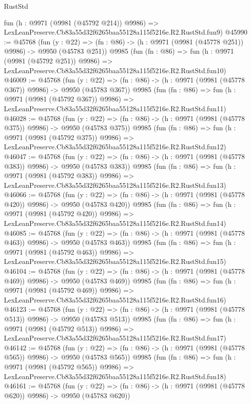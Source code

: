 \begin{lexlean}{RustStd}
\begin{coremodule}
    fun (h : @9971 (@9981 (@45792 @214)) @9986) =>
    LexLeanPreserve.Cb83a55d32f6265baa55128a115f5216e.R2.RustStd.fun9)
@45990 := @45768
    (fun (y : @22) => (fn : @86) -> (h : @9971 (@9981 (@45778 @251)) @9986) -> @9950 (@45783 @251))
    @9985
    (fun (fn : @86) =>
    fun (h : @9971 (@9981 (@45792 @251)) @9986) =>
    LexLeanPreserve.Cb83a55d32f6265baa55128a115f5216e.R2.RustStd.fun10)
@46009 := @45768
    (fun (y : @22) => (fn : @86) -> (h : @9971 (@9981 (@45778 @367)) @9986) -> @9950 (@45783 @367))
    @9985
    (fun (fn : @86) =>
    fun (h : @9971 (@9981 (@45792 @367)) @9986) =>
    LexLeanPreserve.Cb83a55d32f6265baa55128a115f5216e.R2.RustStd.fun11)
@46028 := @45768
    (fun (y : @22) => (fn : @86) -> (h : @9971 (@9981 (@45778 @375)) @9986) -> @9950 (@45783 @375))
    @9985
    (fun (fn : @86) =>
    fun (h : @9971 (@9981 (@45792 @375)) @9986) =>
    LexLeanPreserve.Cb83a55d32f6265baa55128a115f5216e.R2.RustStd.fun12)
@46047 := @45768
    (fun (y : @22) => (fn : @86) -> (h : @9971 (@9981 (@45778 @383)) @9986) -> @9950 (@45783 @383))
    @9985
    (fun (fn : @86) =>
    fun (h : @9971 (@9981 (@45792 @383)) @9986) =>
    LexLeanPreserve.Cb83a55d32f6265baa55128a115f5216e.R2.RustStd.fun13)
@46066 := @45768
    (fun (y : @22) => (fn : @86) -> (h : @9971 (@9981 (@45778 @420)) @9986) -> @9950 (@45783 @420))
    @9985
    (fun (fn : @86) =>
    fun (h : @9971 (@9981 (@45792 @420)) @9986) =>
    LexLeanPreserve.Cb83a55d32f6265baa55128a115f5216e.R2.RustStd.fun14)
@46085 := @45768
    (fun (y : @22) => (fn : @86) -> (h : @9971 (@9981 (@45778 @463)) @9986) -> @9950 (@45783 @463))
    @9985
    (fun (fn : @86) =>
    fun (h : @9971 (@9981 (@45792 @463)) @9986) =>
    LexLeanPreserve.Cb83a55d32f6265baa55128a115f5216e.R2.RustStd.fun15)
@46104 := @45768
    (fun (y : @22) => (fn : @86) -> (h : @9971 (@9981 (@45778 @469)) @9986) -> @9950 (@45783 @469))
    @9985
    (fun (fn : @86) =>
    fun (h : @9971 (@9981 (@45792 @469)) @9986) =>
    LexLeanPreserve.Cb83a55d32f6265baa55128a115f5216e.R2.RustStd.fun16)
@46123 := @45768
    (fun (y : @22) => (fn : @86) -> (h : @9971 (@9981 (@45778 @513)) @9986) -> @9950 (@45783 @513))
    @9985
    (fun (fn : @86) =>
    fun (h : @9971 (@9981 (@45792 @513)) @9986) =>
    LexLeanPreserve.Cb83a55d32f6265baa55128a115f5216e.R2.RustStd.fun17)
@46142 := @45768
    (fun (y : @22) => (fn : @86) -> (h : @9971 (@9981 (@45778 @565)) @9986) -> @9950 (@45783 @565))
    @9985
    (fun (fn : @86) =>
    fun (h : @9971 (@9981 (@45792 @565)) @9986) =>
    LexLeanPreserve.Cb83a55d32f6265baa55128a115f5216e.R2.RustStd.fun18)
@46161 := @45768
    (fun (y : @22) => (fn : @86) -> (h : @9971 (@9981 (@45778 @620)) @9986) -> @9950 (@45783 @620))

\end{coremodule}
\end{lexlean}
